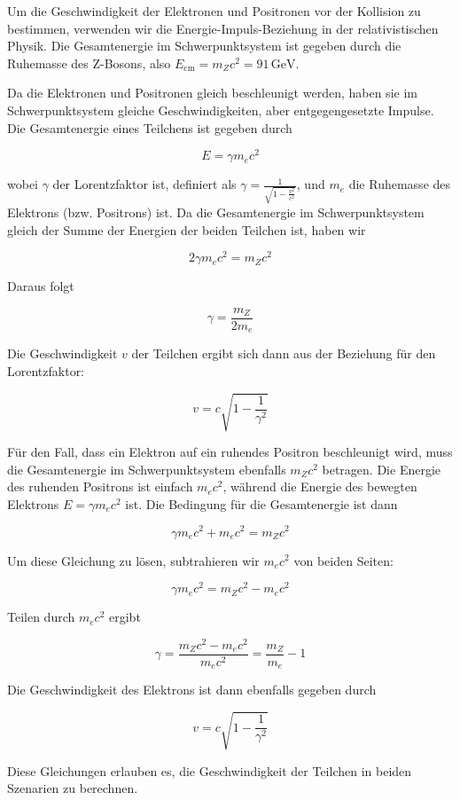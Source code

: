 Um die Geschwindigkeit der Elektronen und Positronen vor der Kollision zu bestimmen, verwenden wir die Energie-Impuls-Beziehung in der relativistischen Physik. Die Gesamtenergie im Schwerpunktsystem ist gegeben durch die Ruhemasse des Z-Bosons, also \( E_{\text{cm}} = m_Z c^2 = 91 \, \text{GeV} \).

Da die Elektronen und Positronen gleich beschleunigt werden, haben sie im Schwerpunktsystem gleiche Geschwindigkeiten, aber entgegengesetzte Impulse. Die Gesamtenergie eines Teilchens ist gegeben durch

\[
E = \gamma m_e c^2
\]

wobei \(\gamma\) der Lorentzfaktor ist, definiert als \(\gamma = \frac{1}{\sqrt{1 - \frac{v^2}{c^2}}}\), und \(m_e\) die Ruhemasse des Elektrons (bzw. Positrons) ist. Da die Gesamtenergie im Schwerpunktsystem gleich der Summe der Energien der beiden Teilchen ist, haben wir

\[
2 \gamma m_e c^2 = m_Z c^2
\]

Daraus folgt

\[
\gamma = \frac{m_Z}{2 m_e}
\]

Die Geschwindigkeit \(v\) der Teilchen ergibt sich dann aus der Beziehung für den Lorentzfaktor:

\[
v = c \sqrt{1 - \frac{1}{\gamma^2}}
\]

Für den Fall, dass ein Elektron auf ein ruhendes Positron beschleunigt wird, muss die Gesamtenergie im Schwerpunktsystem ebenfalls \(m_Z c^2\) betragen. Die Energie des ruhenden Positrons ist einfach \(m_e c^2\), während die Energie des bewegten Elektrons \(E = \gamma m_e c^2\) ist. Die Bedingung für die Gesamtenergie ist dann

\[
\gamma m_e c^2 + m_e c^2 = m_Z c^2
\]

Um diese Gleichung zu lösen, subtrahieren wir \(m_e c^2\) von beiden Seiten:

\[
\gamma m_e c^2 = m_Z c^2 - m_e c^2
\]

Teilen durch \(m_e c^2\) ergibt

\[
\gamma = \frac{m_Z c^2 - m_e c^2}{m_e c^2} = \frac{m_Z}{m_e} - 1
\]

Die Geschwindigkeit des Elektrons ist dann ebenfalls gegeben durch

\[
v = c \sqrt{1 - \frac{1}{\gamma^2}}
\]

Diese Gleichungen erlauben es, die Geschwindigkeit der Teilchen in beiden Szenarien zu berechnen.

